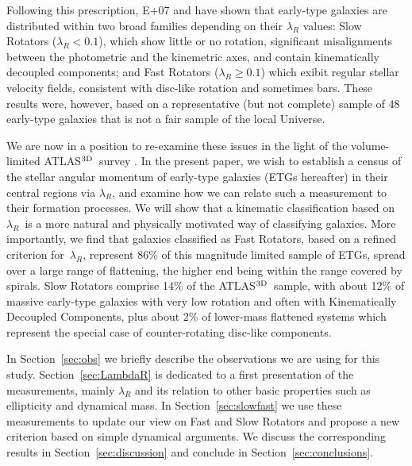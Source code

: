 \documentclass[useAMS,usenatbib,usegraphicx]{mn2e}
\newcommand{\atlas}{{ATLAS$^{\rm 3D}$}}
\newcommand{\lr}{\,{$\lambda_R$}}
\begin{document}
Following this prescription, E+07 and \citet[][hereafter C+07]{PaperX} have shown that early-type galaxies are
distributed within two broad families depending on their $\lambda_R$ values: Slow Rotators ($\lambda_R < 0.1$),
which show little or no rotation, significant misalignments between the
photometric and the kinemetric axes, and contain kinematically decoupled components;
and Fast Rotators ($\lambda_R \geq 0.1$) which exibit regular stellar velocity
fields, consistent with disc-like rotation \citep{PaperXII} and sometimes bars.
These results were, however, based on a representative (but not
complete) sample of 48 early-type galaxies that is not a fair sample of the
local Universe.

We are now in a position to re-examine these issues in the light of 
the volume-limited \atlas\ survey \citep[][hereafter, Paper~I]{Cappellari+11a}. 
In the present paper, we wish to establish a census of the
stellar angular momentum of early-type galaxies (ETGs hereafter) in their
central regions via $\lambda_R$, and examine how we can relate such a measurement to their formation
processes. We will show that a kinematic classification based on \lr\ is a more
natural and physically motivated way of classifying galaxies. 
More importantly, we find that galaxies classified as Fast Rotators,
based on a refined criterion for \lr, represent 86\% of this magnitude limited
sample of ETGs, spread over a large range of flattening, the higher end being
within the range covered by spirals. Slow Rotators comprise 14\% of the \atlas\ sample, with about 12\%
of massive early-type galaxies with very low rotation and often with
Kinematically Decoupled Components, plus about 2\% of lower-mass flattened systems 
which represent the special case of counter-rotating disc-like components.

In Section~\ref{sec:obs} we briefly describe the observations we are using for
this study. Section~\ref{sec:LambdaR} is dedicated to a first presentation of the
measurements, mainly $\lambda_R$ and its relation to other basic properties such
as ellipticity and dynamical mass. In Section~\ref{sec:slowfast} we use these measurements to
update our view on Fast and Slow Rotators and propose a new criterion based on
simple dynamical arguments. We discuss the corresponding results in
Section~\ref{sec:discussion} and conclude in Section~\ref{sec:conclusions}.

\end{document}
